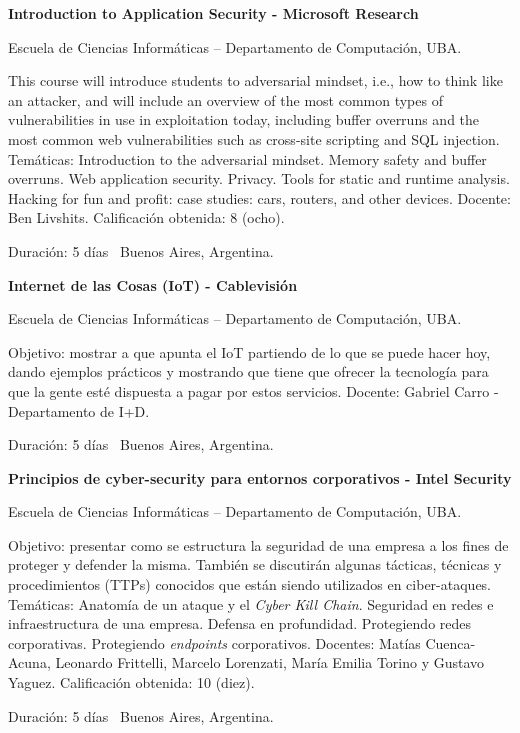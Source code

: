 \documentclass[letterpaper,MMMyyyy,nonstop]{simpleresumecv}
\begin{document}
\begin{body}
\BigGap

\textbf{Introduction to Application Security - Microsoft Research}
\hfill
{}

\BulletItem Escuela de Ciencias Informáticas – Departamento de Computación, UBA.
\begin{detail}
	\SubBulletItem
	This course will introduce students to adversarial mindset, i.e., how to think like an attacker, and will include an overview of the most common types of vulnerabilities in use in exploitation today, including buffer overruns and the most common web vulnerabilities such as cross-site scripting and SQL injection.
	\SubBulletItem
	Temáticas: Introduction to the adversarial mindset. Memory safety and buffer overruns. Web application security. Privacy. Tools for static and runtime analysis. Hacking for fun and profit: case studies: cars, routers, and other devices.
	\SubBulletItem
	Docente: Ben Livshits.
	\SubBulletItem
	Calificación obtenida: 8 (ocho).
\end{detail}
Duración: 5 días \SubBulletSymbol\, Buenos Aires, Argentina.

\BigGap
\textbf{Internet de las Cosas (IoT) - Cablevisión}
\hfill
{}

\BulletItem Escuela de Ciencias Informáticas – Departamento de Computación, UBA.
\begin{detail}
	\SubBulletItem
	Objetivo: mostrar a que apunta el IoT partiendo de lo que se puede hacer hoy, dando ejemplos prácticos y  mostrando que tiene que ofrecer la tecnología para que la gente	esté dispuesta a pagar por estos servicios.	
	\SubBulletItem
	Docente: Gabriel Carro - Departamento de I+D.
\end{detail}
Duración: 5 días \SubBulletSymbol\, Buenos Aires, Argentina.

\BigGap
\textbf{Principios de cyber-security para entornos corporativos - Intel Security}
\hfill
{}

\BulletItem Escuela de Ciencias Informáticas – Departamento de Computación, UBA.
\begin{detail}
	\SubBulletItem
	Objetivo: presentar como se estructura la seguridad de una empresa a los fines de proteger y defender la  misma. También se discutirán algunas tácticas, técnicas y procedimientos (TTPs) conocidos que están siendo utilizados en ciber-ataques.
	\SubBulletItem
	Temáticas: Anatomía de un ataque y el \textit{Cyber Kill Chain}. Seguridad en redes e infraestructura de una empresa. Defensa en profundidad. Protegiendo redes corporativas. Protegiendo \textit{endpoints} corporativos.
	\SubBulletItem
	Docentes: Matías Cuenca-Acuna, Leonardo Frittelli, Marcelo Lorenzati,  María  Emilia  Torino  y Gustavo Yaguez.
	\SubBulletItem
	Calificación obtenida: 10 (diez).
\end{detail}
Duración: 5 días \SubBulletSymbol\, Buenos Aires, Argentina.


\end{body}
\end{document}
